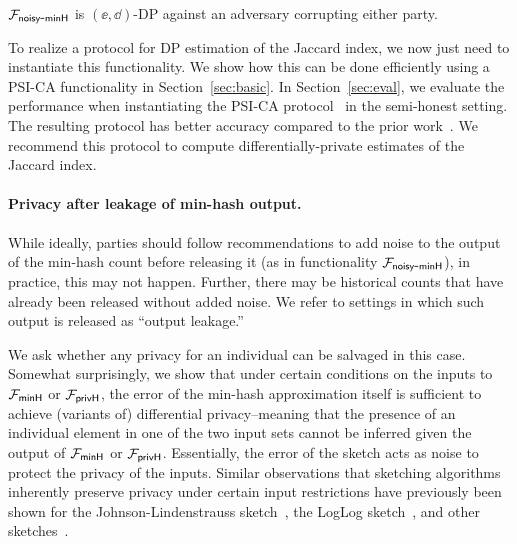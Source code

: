 \begin{theorem}[Informal]
    ${\mathcal{F}_\mathsf{noisy\mbox{-}minH}}$ is $(\ee, \dd)$-DP against an adversary corrupting either party.
\end{theorem}

To realize a protocol for DP estimation of the Jaccard index, we now just need
to instantiate this functionality.  We show how this can be done efficiently using a PSI-CA functionality in Section~\ref{sec:basic}. In Section~\ref{sec:eval}, we evaluate
the performance when instantiating the PSI-CA
protocol~\cite{DGT12,TL23} in the semi-honest setting. The resulting protocol
has better accuracy compared to the prior work~\cite{ICML:HehTinCor23,sisap:AumBouSch20}. We recommend this protocol to
compute differentially-private estimates of the Jaccard index.


\paragraph{Privacy after leakage of min-hash output.}
While ideally, parties should follow recommendations to add noise to the output of the min-hash count before releasing it (as in functionality ${\mathcal{F}_\mathsf{noisy\mbox{-}minH}}$),
in practice, this may not happen. Further, there may be historical counts that have already been released without added noise.
We refer to settings in which such output is released as ``output leakage.''

We ask whether any privacy for an individual can be salvaged in this case.
Somewhat surprisingly, we show that  under certain 
conditions on the inputs to ${\mathcal{F}_\mathsf{minH}}$ or ${\mathcal{F}_\mathsf{privH}}$, the error of the min-hash approximation itself is sufficient to achieve (variants of) differential privacy--meaning that the presence of an individual element in one of the two input sets cannot be inferred given the output of ${\mathcal{F}_\mathsf{minH}}$ or ${\mathcal{F}_\mathsf{privH}}$.  Essentially, the error of the sketch acts as noise to protect the privacy of the inputs.
Similar observations that sketching algorithms inherently preserve privacy under certain input restrictions have previously been shown for the Johnson-Lindenstrauss sketch~\cite{FOCS:BBDS12}, the LogLog sketch~\cite{choi2020differentially,smith2020flajolet}, and other sketches~\cite{wang2022differentially}.  

